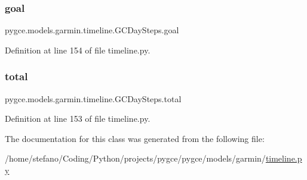 \subsubsection{\texorpdfstring{goal}{goal}}
{\footnotesize\ttfamily pygce.\+models.\+garmin.\+timeline.\+G\+C\+Day\+Steps.\+goal}



Definition at line 154 of file timeline.\+py.

\mbox{\label{classpygce_1_1models_1_1garmin_1_1timeline_1_1_g_c_day_steps_accaf8fa0f07a44164f5e2ee3a4c5fca7}} 
\subsubsection{\texorpdfstring{total}{total}}
{\footnotesize\ttfamily pygce.\+models.\+garmin.\+timeline.\+G\+C\+Day\+Steps.\+total}



Definition at line 153 of file timeline.\+py.



The documentation for this class was generated from the following file\+:\begin{DoxyCompactItemize}
\item 
/home/stefano/\+Coding/\+Python/projects/pygce/pygce/models/garmin/\hyperlink{timeline_8py}{timeline.\+py}\end{DoxyCompactItemize}
